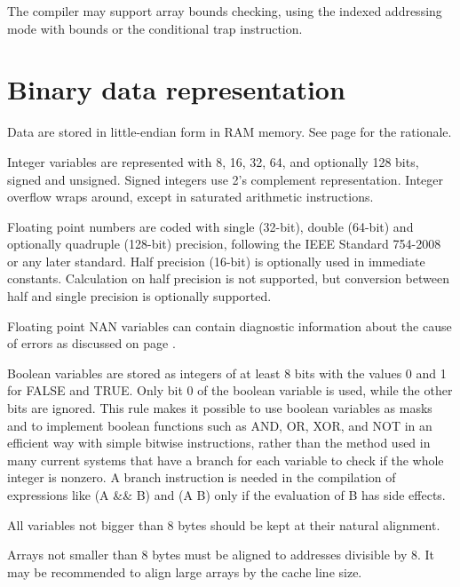 \documentclass[forwardcom.tex]{subfiles}
\begin{document}
\vspace{2mm}
The compiler may support array bounds checking, using the indexed addressing mode with bounds or the conditional trap instruction. 

\section{Binary data representation} \label{binaryDataRepresentation}
Data are stored in little-endian form in RAM memory. See page \pageref{endianness} for the rationale. 
\vspace{2mm}

Integer variables are represented with 8, 16, 32, 64, and optionally 128 bits, signed and unsigned. Signed integers use 2's complement representation. Integer overflow wraps around, except in saturated arithmetic instructions. 
\vspace{2mm}

Floating point numbers are coded with single (32-bit), double (64-bit) and optionally quadruple (128-bit) precision, following the IEEE Standard 754-2008 or any later standard. Half precision (16-bit) is optionally used in immediate constants. Calculation on half precision is not supported, but conversion between half and single precision is optionally supported. 
\vspace{2mm}

Floating point NAN variables can contain diagnostic information about the cause of errors as discussed on page \pageref{nanPropagation}. 
\vspace{2mm}

Boolean variables are stored as integers of at least 8 bits with the values 0 and 1 for FALSE and TRUE. Only bit 0 of the boolean variable is used, while the other bits are ignored. This rule makes it possible to use boolean variables as masks and to implement boolean functions such as AND, OR, XOR, and NOT in an efficient way with simple bitwise instructions, rather than the method used in many current systems that have a branch for each variable to check if the whole integer is nonzero. A branch instruction is needed in the compilation of expressions like (A \&\& B) and (A \textbar\textbar{} B) only if the evaluation of B has side effects. 
\vspace{2mm}

All variables not bigger than 8 bytes should be kept at their natural alignment.
\vspace{2mm}

Arrays not smaller than 8 bytes must be aligned to addresses divisible by 8. It may be recommended to align large arrays by the cache line size. 
\vspace{2mm}
\end{document}

